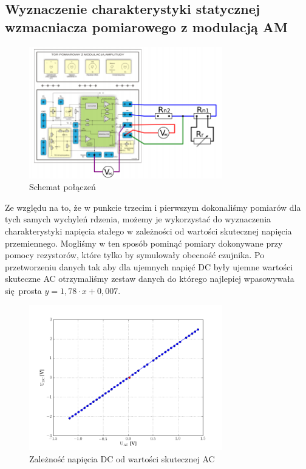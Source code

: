 \documentclass[a4paper, 12pt, titlepage]{article}
\begin{document}
		\subsection{Wyznaczenie charakterystyki statycznej wzmacniacza pomiarowego z modulacją AM}
			\begin{figure}[H]
				\centering
				\includegraphics[width=0.75\textwidth]{./img/tor_drugie.png}
				\caption{\small{Schemat połączeń}}
			\end{figure} \noindent
			Ze względu na to, że w punkcie trzecim i pierwszym dokonaliśmy pomiarów dla tych samych wychyleń rdzenia, możemy je wykorzystać do wyznaczenia charakterystyki napięcia stałego w zależności od wartości skutecznej napięcia przemiennego. Mogliśmy w ten sposób pominąć pomiary dokonywane przy pomocy rezystorów, które tylko by symulowały obecność czujnika. Po przetworzeniu danych tak aby dla ujemnych napięć DC były ujemne wartości skuteczne AC otrzymaliśmy zestaw danych do którego najlepiej wpasowywała się prosta $y = 1,78 \cdot x + 0,007$.
			\begin{figure}[H]
				\centering
				\includegraphics[width=0.75\textwidth]{./img/Uac_od_Udc.png}
				\caption{\small{Zależność napięcia DC od wartości skutecznej AC}}
			\end{figure} \noindent
\end{document}

